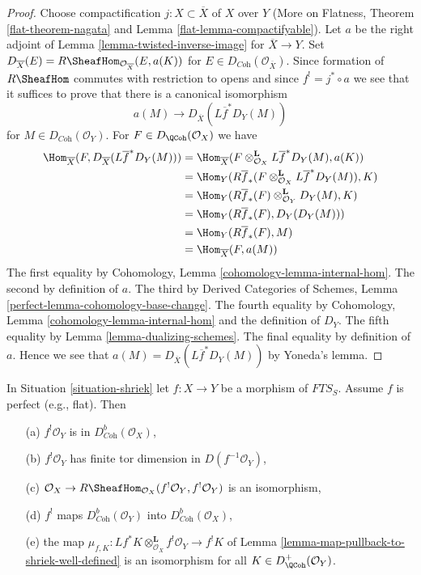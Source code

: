 \begin{proof}
Choose compactification $j : X \subset \overline{X}$ of $X$ over $Y$
(More on Flatness, Theorem \ref{flat-theorem-nagata} and
Lemma \ref{flat-lemma-compactifyable}). Let $a$ be the
right adjoint of Lemma \ref{lemma-twisted-inverse-image} for
$\overline{X} \to Y$. Set
$D_{\overline{X}}(E) = R\SheafHom_{\mathcal{O}_{\overline{X}}}(E, a(K))$
for $E \in D_{\textit{Coh}}(\mathcal{O}_{\overline{X}})$.
Since formation of $R\SheafHom$ commutes with restriction to opens
and since $f^! = j^* \circ a$ we see that it suffices to prove that
there is a canonical isomorphism
$$
a(M) \longrightarrow D_{\overline{X}}(L\overline{f}^*D_Y(M))
$$
for $M \in D_{\textit{Coh}}(\mathcal{O}_Y)$. For
$F \in D_\QCoh(\mathcal{O}_X)$ we have
\begin{align*}
\Hom_{\overline{X}}(
F, D_{\overline{X}}(L\overline{f}^*D_Y(M)))
& =
\Hom_{\overline{X}}(
F \otimes_{\mathcal{O}_X}^\mathbf{L} L\overline{f}^*D_Y(M), a(K)) \\
& =
\Hom_Y(
R\overline{f}_*(F \otimes_{\mathcal{O}_X}^\mathbf{L} L\overline{f}^*D_Y(M)),
K) \\
& =
\Hom_Y(
R\overline{f}_*(F) \otimes_{\mathcal{O}_Y}^\mathbf{L} D_Y(M),
K) \\
& =
\Hom_Y(
R\overline{f}_*(F), D_Y(D_Y(M))) \\
& =
\Hom_Y(R\overline{f}_*(F), M) \\
& = \Hom_{\overline{X}}(F, a(M))
\end{align*}
The first equality by Cohomology, Lemma \ref{cohomology-lemma-internal-hom}.
The second by definition of $a$.
The third by Derived Categories of Schemes, Lemma
\ref{perfect-lemma-cohomology-base-change}.
The fourth equality by Cohomology, Lemma \ref{cohomology-lemma-internal-hom}
and the definition of $D_Y$.
The fifth equality by Lemma \ref{lemma-dualizing-schemes}.
The final equality by definition of $a$.
Hence we see that $a(M) = D_{\overline{X}}(L\overline{f}^*D_Y(M))$
by Yoneda's lemma.
\end{proof}

\begin{lemma}
\label{lemma-perfect-comparison-shriek}
In Situation \ref{situation-shriek} let $f : X \to Y$ be a morphism of
$\textit{FTS}_S$. Assume $f$ is perfect (e.g., flat). Then
\begin{enumerate}
\item[(a)] $f^!\mathcal{O}_Y$ is in $D_{\textit{Coh}}^b(\mathcal{O}_X)$,
\item[(b)] $f^!\mathcal{O}_Y$ has finite tor dimension in
$D(f^{-1}\mathcal{O}_Y)$,
\item[(c)] $\mathcal{O}_X \to
R\SheafHom_{\mathcal{O}_X}(f^!\mathcal{O}_Y, f^!\mathcal{O}_Y)$
is an isomorphism,
\item[(d)] $f^!$ maps $D_{\textit{Coh}}^b(\mathcal{O}_Y)$ into
$D_{\textit{Coh}}^b(\mathcal{O}_X)$,
\item[(e)] the map
$\mu_{f,  K} :
Lf^*K \otimes_{\mathcal{O}_X}^\mathbf{L} f^!\mathcal{O}_Y
\to
f^!K$
of Lemma \ref{lemma-map-pullback-to-shriek-well-defined}
is an isomorphism for all $K \in D_\QCoh^+(\mathcal{O}_Y)$.
\end{enumerate}
\end{lemma}

